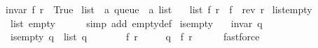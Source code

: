 \begin{isabellebody}
\ \ {\isachardoublequoteopen}invar\ {\isacharparenleft}{\kern0pt}f{\isacharcomma}{\kern0pt}\ r{\isacharparenright}{\kern0pt}\ {\isacharequal}{\kern0pt}\ True{\isachardoublequoteclose}\isanewline
\isanewline
{}\isamarkupfalse%
\ list\ {\isacharcolon}{\kern0pt}{\isacharcolon}{\kern0pt}\ {\isachardoublequoteopen}{\isacharprime}{\kern0pt}a\ queue\ {\isasymRightarrow}\ {\isacharprime}{\kern0pt}a\ list{\isachardoublequoteclose}\ \isanewline
\ \ {\isachardoublequoteopen}list\ {\isacharparenleft}{\kern0pt}f{\isacharcomma}{\kern0pt}\ r{\isacharparenright}{\kern0pt}\ {\isacharequal}{\kern0pt}\ f\ {\isacharat}{\kern0pt}\ {\isacharparenleft}{\kern0pt}rev\ r{\isacharparenright}{\kern0pt}{\isachardoublequoteclose}\isanewline
%
\isadeliminvisible
\isanewline
%
\endisadeliminvisible
%
\isataginvisible
{}\isamarkupfalse%
\ list{\isacharunderscore}{\kern0pt}empty{\isacharcolon}{\kern0pt}\isanewline
\ \ \ {\isachardoublequoteopen}list\ empty\ {\isacharequal}{\kern0pt}\ {\isacharbrackleft}{\kern0pt}{\isacharbrackright}{\kern0pt}{\isachardoublequoteclose}%
\endisataginvisible
{\isafoldinvisible}%
%
\isadeliminvisible
\isanewline
%
\endisadeliminvisible
%
\isadelimproof
\ \ %
\endisadelimproof
%
\isatagproof
{}\isamarkupfalse%
\ {\isacharparenleft}{\kern0pt}simp\ add{\isacharcolon}{\kern0pt}\ empty{\isacharunderscore}{\kern0pt}def{\isacharparenright}{\kern0pt}%
\endisatagproof
{\isafoldproof}%
%
\isadelimproof
\isanewline
%
\endisadelimproof
%
\isadeliminvisible
\isanewline
%
\endisadeliminvisible
%
\isataginvisible
{}\isamarkupfalse%
\ is{\isacharunderscore}{\kern0pt}empty{\isacharcolon}{\kern0pt}\isanewline
\ \ \ {\isachardoublequoteopen}invar\ q{\isachardoublequoteclose}\isanewline
\ \ \ {\isachardoublequoteopen}is{\isacharunderscore}{\kern0pt}empty\ q\ {\isasymlongleftrightarrow}\ list\ q\ {\isacharequal}{\kern0pt}\ {\isacharbrackleft}{\kern0pt}{\isacharbrackright}{\kern0pt}{\isachardoublequoteclose}%
\endisataginvisible
{\isafoldinvisible}%
%
\isadeliminvisible
\isanewline
%
\endisadeliminvisible
%
\isadelimproof
%
\endisadelimproof
%
\isatagproof
{}\isamarkupfalse%
\ {\isacharminus}{\kern0pt}\isanewline
\ \ \isamarkupfalse%
\ f\ r\ \isanewline
\ \ \ \ {\isachardoublequoteopen}q\ {\isacharequal}{\kern0pt}\ {\isacharparenleft}{\kern0pt}f{\isacharcomma}{\kern0pt}\ r{\isacharparenright}{\kern0pt}{\isachardoublequoteclose}\isanewline
\ \ \ \ \isamarkupfalse%
\ fastforce\isanewline

\end{isabellebody}

